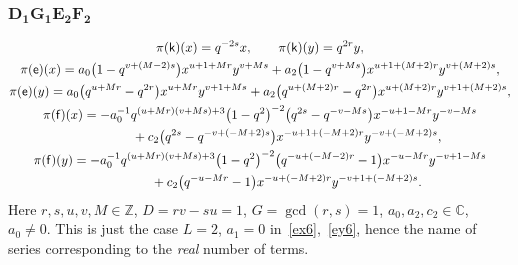 \documentclass[pdftex]{sigma}
\numberwithin{equation}{section}
\begin{document}
\subsubsection*{$\boldsymbol{D_1G_1E_2F_2}$}
\begin{gather*}
\pi(\mathsf{k})(x)= q^{-2s}x ,\qquad\pi(\mathsf{k})(y)=q^{2r}y ,\\
\pi(\mathsf{e})(x)= a_0\big(1-q^{v+(M-2)s}\big)x^{u+1+Mr}y^{v+Ms}+ a_2\big(1-q^{v+Ms}\big)x^{u+1+(M+2)r}y^{v+(M+2)s} ,\\
\pi(\mathsf{e})(y)= a_0\big(q^{u+Mr}-q^{2r}\big)x^{u+Mr}y^{v+1+Ms}+ a_2\big(q^{u+(M+2)r}-q^{2r}\big)x^{u+(M+2)r}y^{v+1+(M+2)s} ,\\
\pi(\mathsf{f})(x)= -a_0^{-1}q^{(u+Mr)(v+Ms)+3}\big(1-q^2\big)^{-2}\big(q^{2s}-q^{-v-Ms}\big)x^{-u+1-Mr}y^{-v-Ms}\\
\hphantom{\pi(\mathsf{f})(x)=}{}+ c_2\big(q^{2s}-q^{-v+(-M+2)s}\big)x^{-u+1+(-M+2)r}y^{-v+(-M+2)s} ,\\
\pi(\mathsf{f})(y)= -a_0^{-1}q^{(u+Mr)(v+Ms)+3}\big(1-q^2\big)^{-2}\big(q^{-u+(-M-2)r}-1\big)x^{-u-Mr}y^{-v+1-Ms}\\
\hphantom{\pi(\mathsf{f})(y)=}{}+ c_2\big(q^{-u-Mr}-1\big)x^{-u+(-M+2)r}y^{-v+1+(-M+2)s} .
\end{gather*}
Here $r,s,u,v,M\in\mathbb{Z}$, $D=rv-su=1$, $G=\operatorname{gcd}(r,s)=1$, $a_0,a_2,c_2\in\mathbb{C}$, $a_0\ne 0$. This is just the case $L=2$, $a_1=0$ in~\eqref{ex6},~\eqref{ey6}, hence the name of series corresponding to the {\it real} number of terms.
\end{document}
